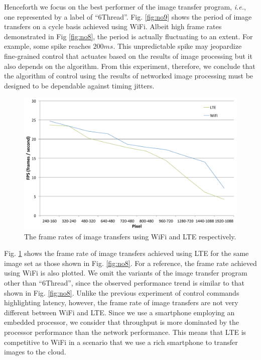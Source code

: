 Henceforth we focus on the best performer of the image transfer program,
\textit{i.e.}, one represented by a label of ``6Thread''.
Fig. \ref{fig:no9} shows the period of image transfers on a cycle basis
achieved using WiFi.
Albeit high frame rates demonstrated in Fig \ref{fig:no8}, the period is
actually fluctuating to an extent.
For example, some spike reaches $200ms$.
This unpredictable spike may jeopardize fine-grained control that actuates
based on the results of image processing but it also depends on the
algorithm.
From this experiment, therefore, we conclude that the algorithm of
control using the results of networked image processing must be designed
to be dependable against timing jitters.

\begin{figure}[!t]
 \centering
 \includegraphics[width=0.8\hsize]{fig/No10_TIPiC_FPS_graph_LTE.pdf}
 \caption{The frame rates of image transfers using WiFi and LTE
 respectively.}
 \label{fig:no10}
\end{figure}

Fig. \ref{fig:no10} shows the frame rate of image transfers achieved
using LTE for the same image set as those shown in Fig. \ref{fig:no8}.
For a reference, the frame rate achieved using WiFi is also plotted.
We omit the variants of the image transfer program other than
``6Thread'', since the observed performance trend is similar to that
shown in Fig. \ref{fig:no8}.
Unlike the previous experiment of control commands highlighting latency,
however, the frame rate of image transfers are not very different
between WiFi and LTE.
Since we use a smartphone employing an embedded processor, we consider
that throughput is more dominated by the processor performance than the
network performance.
This means that LTE is competitive to WiFi in a scenario that we use a
rich smartphone to transfer images to the cloud.

